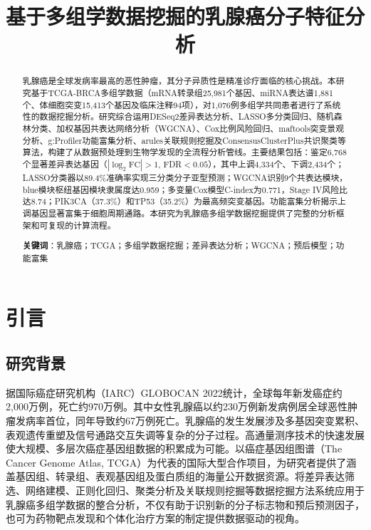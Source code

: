 \documentclass[12pt,a4paper]{ctexart}
\title{\heiti\zihao{3} 基于多组学数据挖掘的乳腺癌分子特征分析}
\author{}
\date{}
\begin{document}
\maketitle

\begin{abstract}
\noindent
乳腺癌是全球发病率最高的恶性肿瘤，其分子异质性是精准诊疗面临的核心挑战。本研究基于TCGA-BRCA多组学数据（mRNA转录组25,981个基因、miRNA表达谱1,881个、体细胞突变15,413个基因及临床注释94项），对1,076例多组学共同患者进行了系统性的数据挖掘分析。研究综合运用DESeq2差异表达分析、LASSO多分类回归、随机森林分类、加权基因共表达网络分析（WGCNA）、Cox比例风险回归、maftools突变景观分析、g:Profiler功能富集分析、arules关联规则挖掘及ConsensusClusterPlus共识聚类等算法，构建了从数据预处理到生物学发现的全流程分析管线。主要结果包括：鉴定6,768个显著差异表达基因（$|\log_2\text{FC}|>1$, FDR$<0.05$），其中上调4,334个、下调2,434个；LASSO分类器以89.4\%准确率实现三分类分子亚型预测；WGCNA识别9个共表达模块，blue模块枢纽基因模块隶属度达0.959；多变量Cox模型C-index为0.771，Stage IV风险比达8.74；PIK3CA（37.3\%）和TP53（35.2\%）为最高频突变基因。功能富集分析揭示上调基因显著富集于细胞周期通路。本研究为乳腺癌多组学数据挖掘提供了完整的分析框架和可复现的计算流程。

\vspace{1em}
\noindent\textbf{关键词}：乳腺癌；TCGA；多组学数据挖掘；差异表达分析；WGCNA；预后模型；功能富集
\end{abstract}

\newpage

\section{引言}

\subsection{研究背景}

据国际癌症研究机构（IARC）GLOBOCAN 2022统计，全球每年新发癌症约2,000万例，死亡约970万例。其中女性乳腺癌以约230万例新发病例居全球恶性肿瘤发病率首位，同年导致约67万例死亡\cite{sung2024global}。乳腺癌的发生发展涉及多基因突变累积、表观遗传重塑及信号通路交互失调等复杂的分子过程\cite{hanahan2011hallmarks}。高通量测序技术的快速发展使大规模、多层次癌症基因组数据的积累成为可能。以癌症基因组图谱（The Cancer Genome Atlas, TCGA）为代表的国际大型合作项目，为研究者提供了涵盖基因组、转录组、表观基因组及蛋白质组的海量公开数据资源\cite{tcga2012comprehensive}。将差异表达筛选、网络建模、正则化回归、聚类分析及关联规则挖掘等数据挖掘方法系统应用于乳腺癌多组学数据的整合分析，不仅有助于识别新的分子标志物和预后预测因子，也可为药物靶点发现和个体化治疗方案的制定提供数据驱动的视角。
\end{document}
